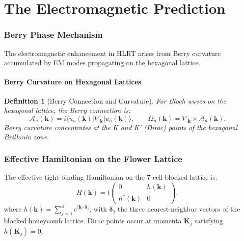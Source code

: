 \documentclass[11pt,letterpaper]{article}
\newtheorem{definition}[theorem]{Definition}
\begin{document}
%
%
\newpage
\part{The Electromagnetic Prediction}

\section{Berry Phase Mechanism}\label{sec:berry}

The electromagnetic enhancement in HLRT arises from Berry curvature
accumulated by EM modes propagating on the hexagonal lattice.

\subsection{Berry Curvature on Hexagonal Lattices}

\begin{definition}[Berry Connection and Curvature]
For Bloch waves on the hexagonal lattice, the Berry connection is:
\begin{equation}
  \mathcal{A}_n(\mathbf{k}) = i\langle u_n(\mathbf{k})|\nabla_\mathbf{k}|u_n(\mathbf{k})\rangle,
  \qquad
  \Omega_n(\mathbf{k}) = \nabla_\mathbf{k}\times\mathcal{A}_n(\mathbf{k}).
\end{equation}
Berry curvature concentrates at the K and K' (Dirac) points of the
hexagonal Brillouin zone.
\end{definition}

\section{Effective Hamiltonian on the Flower Lattice}

The effective tight-binding Hamiltonian on the 7-cell blocked lattice is:
\begin{equation}
  H(\mathbf{k}) = t\begin{pmatrix} 0 & h(\mathbf{k}) \\ h^*(\mathbf{k}) & 0 \end{pmatrix},
\end{equation}
where $h(\mathbf{k}) = \sum_{j=1}^{3} e^{i\mathbf{k}\cdot\boldsymbol{\delta}_j}$,
with $\boldsymbol{\delta}_j$ the three nearest-neighbor vectors of the blocked
honeycomb lattice.  Dirac points occur at momenta $\mathbf{K}_j$ satisfying
$h(\mathbf{K}_j) = 0$.
\end{document}
